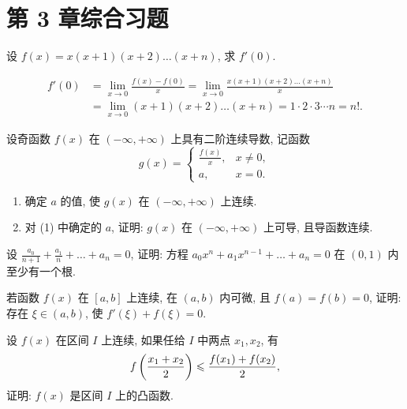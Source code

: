 \section{第 3 章综合习题}

\begin{exercise}[3.C.1]
    设 $f(x) = x(x+1)(x+2)\dots(x+n)$, 求 $f'(0)$.
\end{exercise}

\begin{solution}
    \begin{align*}
        f'(0) &= \lim_{x \to 0} \frac{f(x) - f(0)}{x} = \lim_{x \to 0} \frac{x(x+1)(x+2)\dots(x+n)}{x} \\
                &= \lim_{x \to 0} (x+1)(x+2)\dots(x+n) = 1 \cdot 2 \cdot 3 \cdots n = n!.
    \end{align*}
\end{solution}

\begin{exercise}[3.C.2]
    设奇函数 $f(x)$ 在 $(-\infty, +\infty)$ 上具有二阶连续导数, 记函数
    $$g(x) = \begin{cases} \frac{f(x)}{x}, & x \ne 0, \\ a, & x = 0. \end{cases}$$
    \begin{enumerate}
        \item 确定 $a$ 的值, 使 $g(x)$ 在 $(-\infty, +\infty)$ 上连续.
        \item 对 (1) 中确定的 $a$, 证明: $g(x)$ 在 $(-\infty, +\infty)$ 上可导, 且导函数连续.
    \end{enumerate}
\end{exercise}

\begin{exercise}[3.C.3]
    设 $\frac{a_0}{n+1} + \frac{a_1}{n} + \dots + a_n = 0$, 证明: 方程 $a_0 x^n + a_1 x^{n-1} + \dots + a_n = 0$ 在 $(0, 1)$ 内至少有一个根.
\end{exercise}

\begin{exercise}[3.C.4]
    若函数 $f(x)$ 在 $[a, b]$ 上连续, 在 $(a, b)$ 内可微, 且 $f(a) = f(b) = 0$, 证明: 存在 $\xi \in (a, b)$, 使 $f'(\xi) + f(\xi) = 0$.
\end{exercise}

\begin{exercise}[3.C.5]
    设 $f(x)$ 在区间 $I$ 上连续, 如果任给 $I$ 中两点 $x_1, x_2$, 有
    $$f\left(\frac{x_1 + x_2}{2}\right) \leqslant \frac{f(x_1) + f(x_2)}{2},$$
    证明: $f(x)$ 是区间 $I$ 上的凸函数.
\end{exercise}

